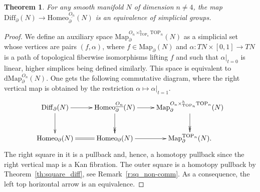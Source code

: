 \documentclass[11pt]{amsart}
\newtheorem{theorem}{Theorem}[section]
\theoremstyle{definition}
\newcommand{\Map}{\mathrm{Map}}
\newcommand{\dMap}{\mathrm{dMap}}
\newcommand{\Diff}{\mathrm{Diff}}
\newcommand{\Homeo}{\mathrm{Homeo}}
\newcommand{\Smooth}{\mathrm{Smooth}}
\newcommand{\TOP}{\mathrm{TOP}}
\newcommand{\OO}{\mathrm{O}}
\numberwithin{equation}{section}
\begin{document}
\begin{theorem}\label{th:diff_compos}
For any smooth manifold $N$ of dimension $n\neq 4$, the map $\Diff_\partial(N)\to \Homeo_\partial^{\underline{O_n}}(N)$  is an equivalence of simplicial groups.
\end{theorem}


\begin{proof}
We define an auxiliary space $\Map^{O_n\times^h_{\TOP_n}\TOP_n}_\partial(N)$ as a simplicial set whose vertices are pairs $(f,\alpha)$, where $f\in\Map_\partial(N)$ and $\alpha\colon TN\times[0,1]\to TN$ is a
 path of topological fiberwise isomorphisms lifting $f$ and such that $\alpha|_{t=0}$ is  linear,  higher simplices being defined similarly. This space is  equivalent to $\dMap^{O_n}_\partial(N)$. 
One gets the following commutative diagram, where the right vertical map is  obtained by the restriction $\alpha\mapsto\alpha|_{t=1}$.
\begin{equation}\label{eq:diff_xxx}
\xymatrix{
\Diff_\partial(N)\ar[d]\ar[r]&\Homeo_\partial^{\underline{O_n}}(N)\ar@{->>}[d]\ar[r]&\Map^{O_n\times^h_{\TOP_n}\TOP_n}_\partial(N)\ar@{->>}[d]\\
\Homeo_\partial(N)\ar@{=}[r]&\Homeo_\partial(N)\ar[r]&\Map_\partial^{\TOP_n}(N).
}
\end{equation}
 The right square in it is a pullback and, hence, a homotopy pullback since the right vertical map is a Kan fibration. The outer square is a homotopy pullback by Theorem~\ref{th:square_diff},
 see Remark~\ref{r:sq_non-comm}. As a consequence, the left top horizontal arrow is an equivalence.

\end{proof}
\end{document}

